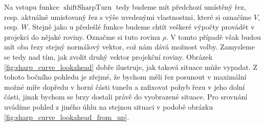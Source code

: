 Na vstupu funkce $ \operatorname{shiftSharpTurn} $ tedy budeme mít předchozí
umístěný řez, resp. aktuálně umisťovaný řez s výše uvedenými vlastnostmi,
které si označíme $ V $,
resp. $ W $. Stejně jako u předešlé funkce budeme chtít veškeré výpočty provádět
v projekci do nějaké roviny. Označme si tuto rovinu $ \rho $.
V tomto případě však budou mít oba řezy stejný
normálový vektor, což nám dává možnost volby. Zamysleme se tedy nad tím,
jak zvolit druhý vektor projekční roviny. Obrázek \ref{fig:sharp_curve_lookahead}
dobře ilustruje, jak taková situace může vypadat. Z tohoto bočního pohledu je
zřejmé, že bychom měli řez posunout v maximální možné míře dopředu v horní části
tunelu a zafixovat pohyb řezu v jeho dolní části, jinak bychom se brzy dostali
právě do vyobrazené situace. Pro srovnání uvádíme pohled z jiného úhlu na stejnou
situaci v podobě obrázku \ref{fig:sharp_curve_lookahead_from_up}.

